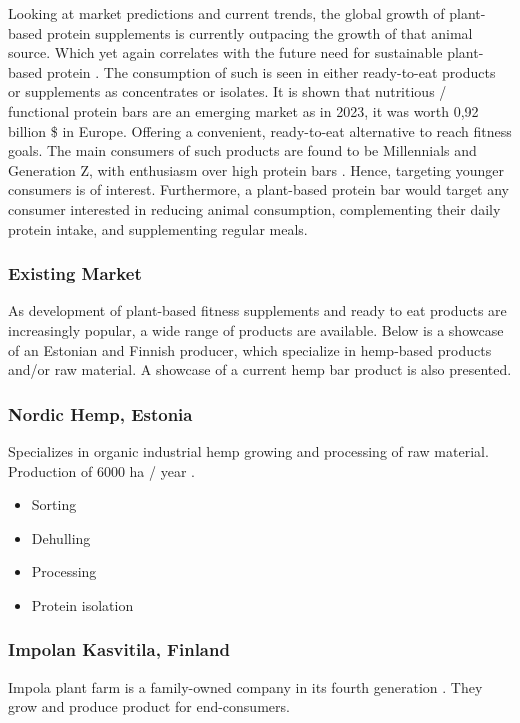 \vspace{1em}
Looking at market predictions and current trends, the global growth of plant-based protein supplements is currently outpacing the growth of that animal source. Which yet again correlates with the future need for sustainable plant-based protein \cite*{MarketUS2024PlantProteinSupplements}. The consumption of such is seen in either ready-to-eat products or supplements as concentrates or isolates. It is shown that nutritious / functional protein bars are an emerging market as in 2023, it was worth 0,92 billion \$ in Europe. Offering a convenient, ready-to-eat alternative to reach fitness goals. The main consumers of such products are found to be Millennials and Generation Z, with enthusiasm over high protein bars \cite*{PWConsulting2024HighProteinBarsMarket}. Hence, targeting younger consumers is of interest. Furthermore, a plant-based protein bar would target any consumer interested in reducing animal consumption, complementing their daily protein intake, and supplementing regular meals.

\subsubsection{Existing Market}
As development of plant-based fitness supplements and ready to eat products are increasingly popular, a wide range of products are available. Below is a showcase of an Estonian and Finnish producer, which specialize in hemp-based products and/or raw material. A showcase of a current hemp bar product is also presented.

\subsubsection*{Nordic Hemp, Estonia}
Specializes in organic industrial hemp growing and processing of raw material. Production of 6000 ha / year \cite*{NordicHempSite}.
\begin{itemize}
    \item Sorting
    \item Dehulling
    \item Processing
    \item Protein isolation
\end{itemize}

\subsubsection*{Impolan Kasvitila, Finland}
Impola plant farm is a family-owned company in its fourth generation \cite*{ImpolanKasvitilaFrontPage}.
They grow and produce product for end-consumers. 

